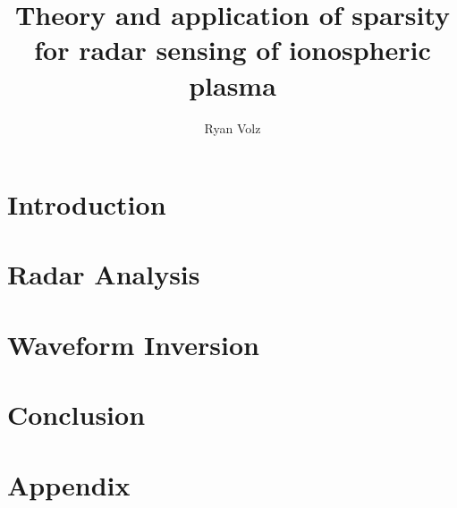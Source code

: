 \documentclass[12pt]{report}
\title{Theory and application of sparsity for radar sensing of ionospheric plasma}
\author{Ryan Volz}
\begin{document}
\beforepreface


\afterpreface

\part{Introduction}
\label{part_introduction}
\graphicspath{{chapters/introduction/figures/}}

\part{Radar Analysis}
\label{part_radar_analysis}
\graphicspath{{chapters/radar_background/figures/}}

\graphicspath{{chapters/radar_model/figures/}}

\part{Waveform Inversion}
\label{part_waveform_inversion}
\graphicspath{{chapters/sparsity_background/figures/}}

\graphicspath{{chapters/waveform_inversion/figures/}}

\graphicspath{{chapters/experimental_results/figures/}}


\part{Conclusion}
\label{part_conclusion}


\appendix
\part{Appendix}


\printbibliography
\end{document}
